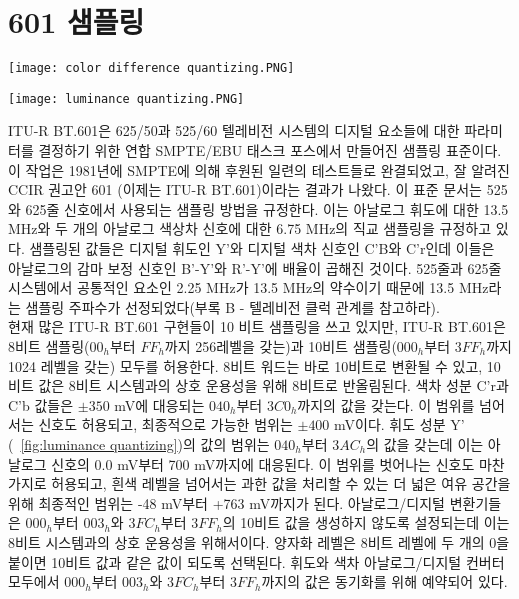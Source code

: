 \section{601 샘플링}
\begin{figure*}[t!]
    \centering
    \texttt{[image: color difference quantizing.PNG]}
    \caption{색차 신호의 양자화}\label{fig:color difference quantizing}
\end{figure*}
\begin{figure*}[h!]
    \centering
    \texttt{[image: luminance quantizing.PNG]}
    \caption{휘도 신호의 양자화}\label{fig:luminance quantizing}
\end{figure*}
ITU-R BT.601은 625/50과 525/60 텔레비전 시스템의 디지털 요소들에 대한 파라미터를 결정하기 위한 연합 SMPTE/EBU 태스크 포스에서 만들어진 샘플링 표준이다.
이 작업은 1981년에 SMPTE에 의해 후원된 일련의 테스트들로 완결되었고, 잘 알려진 CCIR 권고안 601 (이제는 ITU-R BT.601)이라는 결과가 나왔다.
이 표준 문서는 525와 625줄 신호에서 사용되는 샘플링 방법을 규정한다. 이는 아날로그 휘도에 대한 13.5 MHz와 두 개의 아날로그 색상차 신호에 대한 6.75 MHz의 직교 샘플링을 규정하고 있다.
샘플링된 값들은 디지털 휘도인 Y'와 디지털 색차 신호인 C'B와 C'r인데 이들은 아날로그의 감마 보정 신호인 B'-Y'와 R'-Y'에 배율이 곱해진 것이다.
525줄과 625줄 시스템에서 공통적인 요소인 2.25 MHz가 13.5 MHz의 약수이기 때문에 13.5 MHz라는 샘플링 주파수가 선정되었다(부록 B - 텔레비전 클럭 관계를 참고하라).
\\
현재 많은 ITU-R BT.601 구현들이 10 비트 샘플링을 쓰고 있지만, ITU-R BT.601은 8비트 샘플링($00_h$부터 $FF_h$까지 256레벨을 갖는)과 10비트 샘플링($000_h$부터 $3FF_h$까지 1024 레벨을 갖는) 모두를 허용한다.
8비트 워드는 바로 10비트로 변환될 수 있고, 10비트 값은 8비트 시스템과의 상호 운용성을 위해 8비트로 반올림된다. 색차 성분 C'r과 C'b 값들은 $\pm 350$ mV에 대응되는 $040_h$부터 $3C0_h$까지의 값을 갖는다.
이 범위를 넘어서는 신호도 허용되고, 최종적으로 가능한 범위는 $\pm 400$ mV이다. 휘도 성분 Y' (\figurename~\ref{fig:luminance quantizing})의 값의 범위는 $040_h$부터 $3AC_h$의 값을 갖는데 이는 아날로그 신호의 0.0 mV부터 700 mV까지에 대응된다.
이 범위를 벗어나는 신호도 마찬가지로 허용되고, 흰색 레벨을 넘어서는 과한 값을 처리할 수 있는 더 넓은 여유 공간을 위해 최종적인 범위는 -48 mV부터 +763 mV까지가 된다.
아날로그/디지털 변환기들은 $000_h$부터 $003_h$와 $3FC_h$부터 $3FF_h$의 10비트 값을 생성하지 않도록 설정되는데 이는 8비트 시스템과의 상호 운용성을 위해서이다.
양자화 레벨은 8비트 레벨에 두 개의 0을 붙이면 10비트 값과 같은 값이 되도록 선택된다. 휘도와 색차 아날로그/디지털 컨버터 모두에서 $000_h$부터 $003_h$와 $3FC_h$부터 $3FF_h$까지의 값은 동기화를 위해 예약되어 있다.
